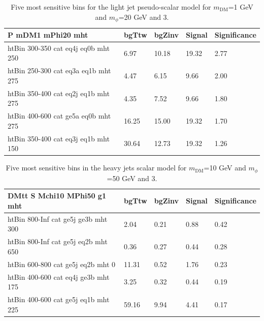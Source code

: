 \begin{table}[h!]
  \centering
  \begin{tabular}{lllll}
    \hline
    \textbf{P mDM1 mPhi20 mht} & bgTtw & bgZinv & Signal & Significance \\ \hline
    htBin 300-350 cat eq4j eq0b mht 250 & 6.97 & 10.18 & 19.32 &2.77 \\
    htBin 250-300 cat eq3a eq1b mht 275 & 4.47 & 6.15 & 9.66 &2.00 \\
    htBin 350-400 cat eq2j eq1b mht 275 & 4.35 & 7.52 & 9.66 &1.80 \\
    htBin 400-600 cat ge5a eq0b mht 275 & 16.25 & 15.00 & 19.32 &1.70 \\
    htBin 350-400 cat eq3j eq1b mht 150 & 30.64 & 12.73 & 19.32 &1.26 \\
    \hline
  \end{tabular}
  \caption{Five most sensitive bins for the light jet pseudo-scalar model for $m_\textrm{DM}$=1 GeV and $m_\phi$=20 GeV and 3\fbinv. \label{tab:bestBins_P_3fb}}
\end {table}



\begin{table}[h!]
  \centering
  \begin{tabular}{lllll}
    \hline
    \textbf{DMtt S Mchi10 MPhi50 g1 mht} & bgTtw & bgZinv & Signal & Significance \\ \hline
    htBin 800-Inf cat ge5j ge3b mht 300 & 2.04 & 0.21 & 0.88 &0.42 \\
    htBin 800-Inf cat ge5j eq2b mht 650 & 0.36 & 0.27 & 0.44 &0.28 \\
    htBin 600-800 cat ge5j eq2b mht 0 & 11.31 & 0.52 & 1.76 &0.23 \\
    htBin 400-600 cat eq4j ge3b mht 175 & 3.25 & 0.32 & 0.44 &0.19 \\
    htBin 400-600 cat ge5j eq1b mht 225 & 59.16 & 9.94 & 4.41 &0.17 \\
    \hline
  \end{tabular}
  \caption{Five most sensitive bins in the heavy jets scalar model for $m_\textrm{DM}$=10 GeV and $m_\phi$=50 GeV and 3\fbinv. \label{tab:bestBins_tt_S_3fb}}
\end {table}



